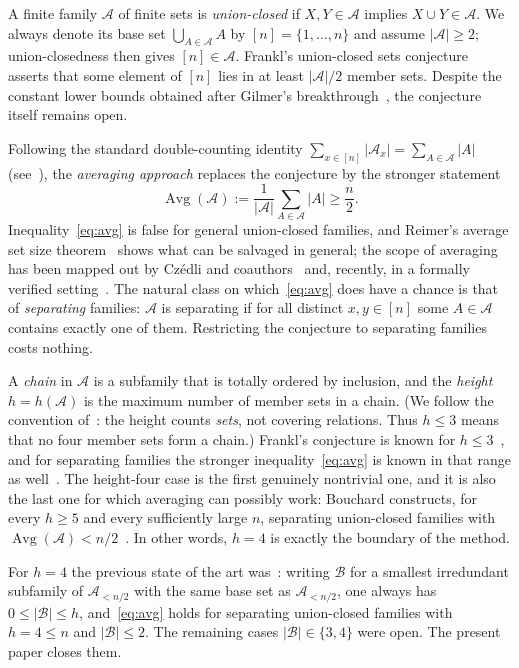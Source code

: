\documentclass[11pt,a4paper]{amsart}
\theoremstyle{plain}
\theoremstyle{definition}
\newcommand{\A}{\mathcal{A}}
\newcommand{\B}{\mathcal{B}}
\newcommand{\Avg}{\operatorname{Avg}}
\begin{document}
A finite family $\A$ of finite sets is \emph{union-closed} if $X,Y\in\A$ implies
$X\cup Y\in\A$. We always denote its base set $\bigcup_{A\in\A}A$ by
$[n]=\{1,\dots,n\}$ and assume $|\A|\ge2$; union-closedness then gives $[n]\in\A$.
Frankl's union-closed sets conjecture~\cite{Frankl95,BruhnSchaudt} asserts that
some element of $[n]$ lies in at least $|\A|/2$ member sets. Despite the constant
lower bounds obtained after Gilmer's breakthrough~\cite{Gilmer,Sawin,AHS}, the
conjecture itself remains open.

Following the standard double-counting identity
$\sum_{x\in[n]}|\A_x|=\sum_{A\in\A}|A|$ (see~\cite[\S6]{BruhnSchaudt}), the
\emph{averaging approach} replaces the conjecture by the stronger statement
\begin{equation}\label{eq:avg}
  \Avg(\A):=\frac1{|\A|}\sum_{A\in\A}|A|\ge\frac n2.
\end{equation}
Inequality~\eqref{eq:avg} is false for general union-closed families, and
Reimer's average set size theorem~\cite{Reimer} shows what can be salvaged in
general; the scope of averaging has been mapped out by Cz\'edli and
coauthors~\cite{Czedli09,CzedliMS} and, recently, in a formally verified
setting~\cite{HachimoriKashiwabara}. The natural class on which~\eqref{eq:avg}
does have a chance is that of \emph{separating} families: $\A$ is separating if
for all distinct $x,y\in[n]$ some $A\in\A$ contains exactly one of them.
Restricting the conjecture to separating families costs nothing.

A \emph{chain} in $\A$ is a subfamily that is totally ordered by inclusion, and
the \emph{height} $h=h(\A)$ is the maximum number of member sets in a chain.
(We follow the convention of~\cite{Bouchard,Tian}: the height counts \emph{sets},
not covering relations. Thus $h\le3$ means that no four member sets form a
chain.) Frankl's conjecture is known for $h\le3$~\cite{Tian}, and for separating
families the stronger inequality~\eqref{eq:avg} is known in that range as
well~\cite[Thm.~1.4]{Bouchard}. The height-four case is the first genuinely
nontrivial one, and it is also the last one for which averaging can possibly
work: Bouchard constructs, for every $h\ge5$ and every sufficiently large $n$,
separating union-closed families with $\Avg(\A)<n/2$~\cite[Thm.~3.2]{Bouchard}.
In other words, $h=4$ is exactly the boundary of the method.

For $h=4$ the previous state of the art was~\cite[Thm.~2.1]{Bouchard}: writing
$\B$ for a smallest irredundant subfamily of $\A_{<n/2}$ with the same base set
as $\A_{<n/2}$, one always has $0\le|\B|\le h$, and~\eqref{eq:avg} holds for
separating union-closed families with $h=4\le n$ and $|\B|\le2$. The remaining
cases $|\B|\in\{3,4\}$ were open. The present paper closes them.
\end{document}
